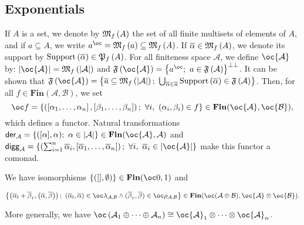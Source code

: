 \subsection{Exponentials}\label{exponentials-1}

If \(A\) is a set, we denote by \(\mathfrak{M}_f\left(A\right)\) the set of all finite
multisets of elements of \(A\), and if \(a\subseteq A\), we write
\(a^{\oc}=\finmulset a\subseteq\finmulset A\). If
\(\overline\alpha\in\mathfrak{M}_f\left(A\right)\), we denote its support by
\(\mathrm{Support}\left(\overline \alpha\right)\in\mathfrak{P}_f\left(A\right)\). For
all finiteness space \({\mathcal A}\), we define \(\oc {\mathcal A}\)
by: \(\web{\oc {\mathcal A}}= \finmulset{\web{{\mathcal A}}}\) and
\(\mathfrak F\left(\oc{\mathcal A}\right)=\left\{a^{\oc};\  a\in\mathfrak F\left({\mathcal A}\right)\right\}\biorth\).
It can be shown that
\(\mathfrak F\left(\oc{\mathcal A}\right) = \left\{\overline a\subseteq\finmulset{\web{{\mathcal A}}};\ \bigcup_{\overline\alpha\in \overline a}\mathrm{Support}\left(\overline \alpha\right)\in\mathfrak F\left(\mathcal A\right)\right\}\).
Then, for all \(f\in\mathbf{Fin}({\mathcal A},{\mathcal B})\), we set
\begin{equation*}
\oc f =\left\{\left(\left[\alpha_1,\ldots,\alpha_n\right],\left[\beta_1,\ldots,\beta_n\right]\right);\  \forall i,\ (\alpha_i,\beta_i)\in f\right\} \in \mathbf{Fin}(\oc {\mathcal A}, \oc {\mathcal B}),
\end{equation*}
which defines a functor. Natural transformations
\(\mathsf{der}_{{\mathcal A}}=\left\{([\alpha],\alpha);\  \alpha\in \web{{\mathcal A}}\right\}\in\mathbf{Fin}(\oc{\mathcal A},{\mathcal A})\)
and
\(\mathsf{digg}_{{\mathcal A}}=\left\{\left(\sum_{i=1}^n\overline\alpha_i,\left[\overline\alpha_1,\ldots,\overline\alpha_n\right]\right);\ \forall i,\ \overline\alpha_i\in\web{\oc {\mathcal A}}\right\}\)
make this functor a comonad.

\begin{example}\label{example.-3}
We have isomorphisms
\(\left\{([],\emptyset)\right\}\in\mathbf{Fin}(\oc\zero,\one)\) and

\(\left\{ \left(\overline\alpha_l+\overline\beta_r,\left(\overline\alpha,\overline\beta\right)\right);\ (\overline\alpha_l,\overline\alpha)\in\oc\lambda_{{\mathcal A},{\mathcal B}}\wedge(\overline\beta_r,\overline\beta)\in\oc\rho_{{\mathcal A},{\mathcal B}}\right\} \in\mathbf{Fin}(\oc({\mathcal A}\oplus{\mathcal B}),\oc{\mathcal A}\tens\oc{\mathcal B}).\)

More generally, we have
\(\oc\left({\mathcal A}_1\oplus\cdots\oplus{\mathcal A}_n\right)\cong\oc{\mathcal A}_1\tens\cdots\tens\oc{\mathcal A}_n\).
\end{example}


